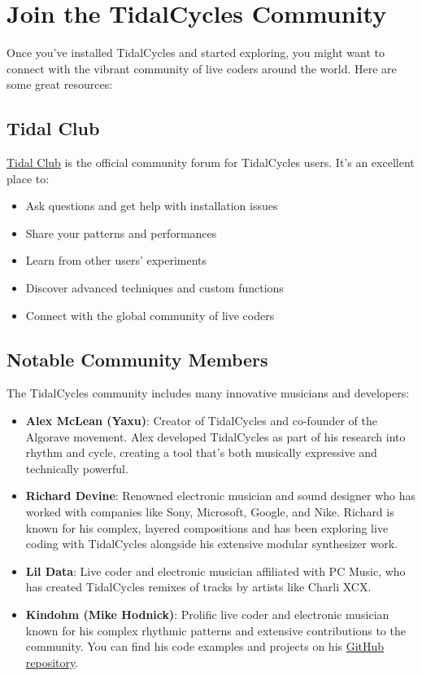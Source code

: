 \documentclass[11pt,a4paper]{article}
\begin{document}
\section{Join the TidalCycles Community}

Once you've installed TidalCycles and started exploring, you might want to connect with the vibrant community of live coders around the world. Here are some great resources:

\subsection{Tidal Club}

\href{https://club.tidalcycles.org/}{Tidal Club} is the official community forum for TidalCycles users. It's an excellent place to:

\begin{itemize}
    \item Ask questions and get help with installation issues
    \item Share your patterns and performances
    \item Learn from other users' experiments
    \item Discover advanced techniques and custom functions
    \item Connect with the global community of live coders
\end{itemize}

\subsection{Notable Community Members}

The TidalCycles community includes many innovative musicians and developers:

\begin{itemize}
    \item \textbf{Alex McLean (Yaxu)}: Creator of TidalCycles and co-founder of the Algorave movement. Alex developed TidalCycles as part of his research into rhythm and cycle, creating a tool that's both musically expressive and technically powerful.

    \item \textbf{Richard Devine}: Renowned electronic musician and sound designer who has worked with companies like Sony, Microsoft, Google, and Nike. Richard is known for his complex, layered compositions and has been exploring live coding with TidalCycles alongside his extensive modular synthesizer work.

    \item \textbf{Lil Data}: Live coder and electronic musician affiliated with PC Music, who has created TidalCycles remixes of tracks by artists like Charli XCX.

    \item \textbf{Kindohm (Mike Hodnick)}: Prolific live coder and electronic musician known for his complex rhythmic patterns and extensive contributions to the community. You can find his code examples and projects on his \href{https://github.com/kindohm}{GitHub repository}.
\end{itemize}
\end{document}
